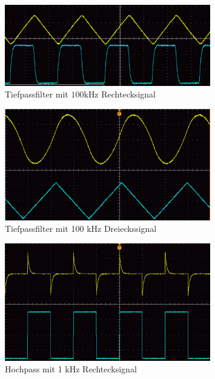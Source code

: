 \documentclass[11pt, a4paper]{article}
\begin{document}
    \begin{figure}[h]
        \centering
        \includegraphics[width=0.8\textwidth]{Tiefpass_Integrierend_rec.png}
        \caption{Tiefpassfilter mit $100 \si{\kilo\hertz}$ Rechtecksignal}
        \label{im:Tirec}
    \end{figure}
    
    \begin{figure}[h]
        \centering
        \includegraphics[width=0.8\textwidth]{Tiefpass_Integrierend_tri.png}
        \caption{Tiefpassfilter mit 100 $\si{\kilo\hertz}$ Dreieckssignal}
        \label{im:Titri}
    \end{figure}
    \begin{figure}[h]
        \centering
        \includegraphics[width=0.8\textwidth]{Hochpass_differenzierend_rec.png}
        \caption{Hochpass mit 1 $\si{\kilo\hertz}$ Rechtecksignal}
        \label{im:Horec}
    \end{figure}
\end{document}
